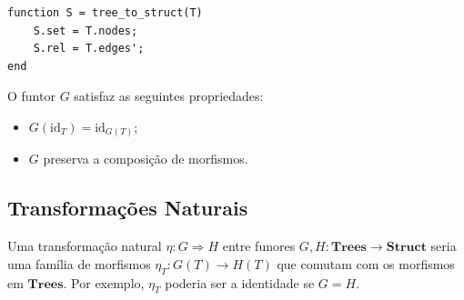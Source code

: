 \begin{lstlisting}[style=matlab, caption={Funtor $G$ aplicado a uma árvore}]
function S = tree_to_struct(T)
    S.set = T.nodes;
    S.rel = T.edges';
end
\end{lstlisting}

\begin{proposition}
O funtor $G$ satisfaz as seguintes propriedades:
\begin{itemize}
    \item $G(\mathrm{id}_T) = \mathrm{id}_{G(T)}$;
    \item $G$ preserva a composição de morfismos.
\end{itemize}
\end{proposition}

\subsection{Transformações Naturais}

Uma transformação natural $\eta: G \Rightarrow H$ entre funores $G, H: \mathbf{Trees} \to \mathbf{Struct}$ seria uma família de morfismos $\eta_T: G(T) \to H(T)$ que comutam com os morfismos em $\mathbf{Trees}$. Por exemplo, $\eta_T$ poderia ser a identidade se $G = H$.